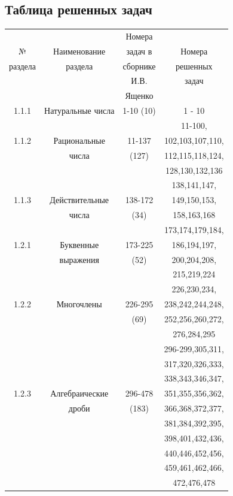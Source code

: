 \subsection*{Таблица решенных задач}
\begin{table}[H]
\begin{center}
\begin{tabular}{|c|c|c|c|}
\hline
~ & ~ & Номера & ~ \\
№ & Наименование & задач в & Номера\\
раздела & раздела & сборнике & решенных\\
~ & ~ & И.В. & задач \\
~ & ~ & Ященко & \\
\hline
1.1.1 &Натуральные числа& 1-10 (10) & 1 - 10\\
\hline
~ & ~ & ~ & 11-100,\\
1.1.2 & Рациональные & 11-137 & 102,103,107,110,\\
~ & числа & (127) & 112,115,118,124,\\
~ & ~ & ~ & 128,130,132,136\\
\hline
~ & ~  & ~ & 138,141,147,\\
1.1.3 & Действительные & 138-172 & 149,150,153,\\
~ & числа & (34) & 158,163,168\\
\hline
~ & ~ & ~ & 173,174,179,184,\\
1.2.1 & Буквенные & 173-225 & 186,194,197,\\
~ & выражения & (52) & 200,204,208,\\
~ & ~ & ~ & 215,219,224\\
\hline
~ & ~ & ~ & 226,230,234,\\
1.2.2 & Многочлены & 226-295 & 238,242,244,248,\\
~ & ~ & (69) & 252,256,260,272,\\
~ & ~ & ~ & 276,284,295\\
\hline
~ & ~ & ~ & 296-299,305,311,\\
~ & ~ & ~ & 317,320,326,333,\\
~ & ~ & ~ & 338,343,346,347,\\
1.2.3 & Алгебраические & 296-478 & 351,355,356,362,\\
~ & дроби & (183) & 366,368,372,377,\\
~& ~ & ~ & 381,384,392,395,\\
~ & ~ & ~ & 398,401,432,436,\\
~ & ~ & ~ & 440,446,452,456,\\
~ & ~ & ~ & 459,461,462,466,\\
~ & ~ & ~ & 472,476,478\\
\hline
\end{tabular}
\end{center}
\end{table}

